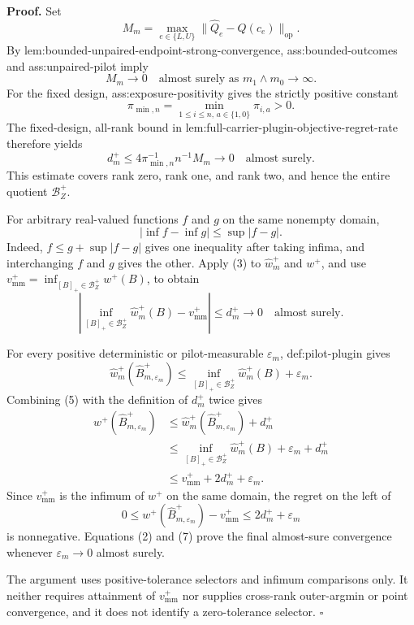 \textbf{Proof.}
Set
\[
M_m=\max_{e\in\{L,U\}}
\lVert\widehat Q_e-Q(c_e)\rVert_{\mathrm{op}}.
\]
By lem:bounded-unpaired-endpoint-strong-convergence, ass:bounded-outcomes and ass:unpaired-pilot imply
\[
M_m\longrightarrow0
\quad\text{almost surely as }m_1\wedge m_0\to\infty.
\tag{1}
\]
For the fixed design, ass:exposure-positivity gives the strictly positive constant
\[
\pi_{\min,n}=\min_{1\le i\le n,\,a\in\{1,0\}}\pi_{i,a}>0.
\]
The fixed-design, all-rank bound in lem:full-carrier-plugin-objective-regret-rate therefore yields
\[
d_m^+
\le4\pi_{\min,n}^{-1}n^{-1}M_m
\longrightarrow0
\quad\text{almost surely}.
\tag{2}
\]
This estimate covers rank zero, rank one, and rank two, and hence the entire quotient \(\mathcal B_Z^+\).

For arbitrary real-valued functions \(f\) and \(g\) on the same nonempty domain,
\[
\left|\inf f-\inf g\right|\le\sup|f-g|.
\tag{3}
\]
Indeed, \(f\le g+\sup|f-g|\) gives one inequality after taking infima, and interchanging \(f\) and \(g\) gives the other.  Apply (3) to \(\widehat w_m^+\) and \(w^+\), and use \(v_{\mathrm{mm}}^+=\inf_{[B]_+\in\mathcal B_Z^+}w^+(B)\), to obtain
\[
\left|
\inf_{[B]_+\in\mathcal B_Z^+}\widehat w_m^+(B)
-v_{\mathrm{mm}}^+
\right|
\le d_m^+\longrightarrow0
\quad\text{almost surely}.
\tag{4}
\]

For every positive deterministic or pilot-measurable \(\varepsilon_m\), def:pilot-plugin gives
\[
\widehat w_m^+(\widehat B_{m,\varepsilon_m}^+)
\le
\inf_{[B]_+\in\mathcal B_Z^+}\widehat w_m^+(B)+\varepsilon_m.
\tag{5}
\]
Combining (5) with the definition of \(d_m^+\) twice gives
\[
\begin{aligned}
w^+(\widehat B_{m,\varepsilon_m}^+)
&\le \widehat w_m^+(\widehat B_{m,\varepsilon_m}^+)+d_m^+\\
&\le \inf_{[B]_+\in\mathcal B_Z^+}\widehat w_m^+(B)
   +\varepsilon_m+d_m^+\\
&\le v_{\mathrm{mm}}^++2d_m^++\varepsilon_m.
\end{aligned}
\tag{6}
\]
Since \(v_{\mathrm{mm}}^+\) is the infimum of \(w^+\) on the same domain, the regret on the left of
\[
0\le
w^+(\widehat B_{m,\varepsilon_m}^+)-v_{\mathrm{mm}}^+
\le2d_m^++\varepsilon_m
\tag{7}
\]
is nonnegative.  Equations (2) and (7) prove the final almost-sure convergence whenever \(\varepsilon_m\to0\) almost surely.

The argument uses positive-tolerance selectors and infimum comparisons only.  It neither requires attainment of \(v_{\mathrm{mm}}^+\) nor supplies cross-rank outer-argmin or point convergence, and it does not identify a zero-tolerance selector. \(\square\)